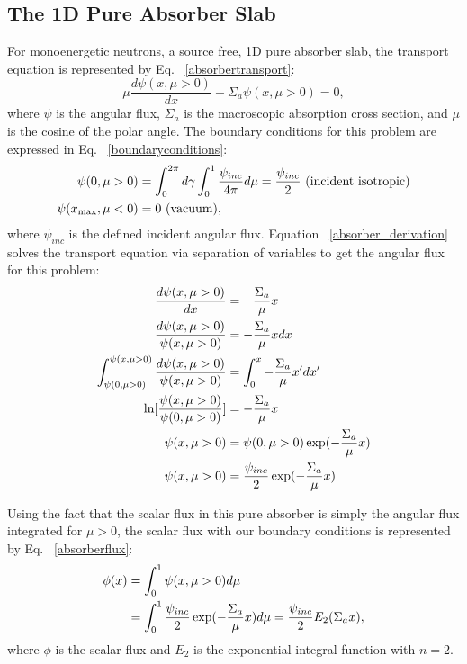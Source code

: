 \subsection{The 1D Pure Absorber Slab}

For monoenergetic neutrons, a source free, 1D pure absorber slab, the transport equation is represented by Eq. ~\eqref{absorbertransport}:
\begin{equation}
\mu \frac{d\psi (x,\mu>0)}{dx} + \Sigma_a \psi(x,\mu>0) = 0,
\label{absorbertransport}
\end{equation}
where $\psi$ is the angular flux, $\Sigma_a$ is the macroscopic absorption cross section, and $\mu$ is the cosine of the polar angle. The boundary conditions for this problem are expressed in Eq. ~\eqref{boundaryconditions}:
\begin{align}
\label{boundaryconditions}
\psi(0,\mu>0) &= \int_{0}^{2\pi}d\gamma \int_{0}^{1}\frac{\psi_{inc}}{4\pi} d\mu = \frac{\psi_{inc}}{2} \text{ (incident isotropic)} \notag \\
\psi(x_{\text{max}},\mu<0) &= 0 \text{ (vacuum)},
\end{align}
where $\psi_{inc}$ is the defined incident angular flux. Equation ~\eqref{absorber_derivation} solves the transport equation via separation of variables to get the angular flux for this problem:
\begin{align}
\label{absorber_derivation}
\frac{d\psi(x,\mu>0)}{dx} &= -\frac{\Sigma_a}{\mu} x \notag \\
\frac{d\psi(x,\mu>0)}{\psi(x,\mu>0)} &= -\frac{\Sigma_a}{\mu} x dx \notag \\
\int_{\psi(0,\mu>0)}^{\psi(x,\mu>0)}\frac{d\psi(x,\mu>0)}{\psi(x,\mu>0)} &= \int_{0}^{x}-\frac{\Sigma_a}{\mu} x' dx' \notag \\
\ln[\frac{\psi(x,\mu>0)}{\psi(0,\mu>0)}] &= -\frac{\Sigma_a}{\mu} x \notag \\
\psi(x,\mu>0) & = \psi(0,\mu>0)\exp(-\frac{\Sigma_a}{\mu} x) \notag \\
\psi(x,\mu>0) & = \frac{\psi_{inc}}{2}\exp(-\frac{\Sigma_a}{\mu} x) 
\end{align}

Using the fact that the scalar flux in this pure absorber is simply the angular flux integrated for $\mu > 0$, the scalar flux with our boundary conditions is represented by Eq. ~\eqref{absorberflux}:
\begin{align}
\phi(x) &= \int_{0}^{1}\psi(x,\mu>0) d\mu \notag \\
&= \int_{0}^{1}\frac{\psi_{inc}}{2}\exp(-\frac{\Sigma_a}{\mu} x) d\mu = \frac{\psi_{inc}}{2} E_{2}(\Sigma_a x),
\label{absorberflux}
\end{align}
where $\phi$ is the scalar flux and $E_2$ is the exponential integral function with $n=2$. 


